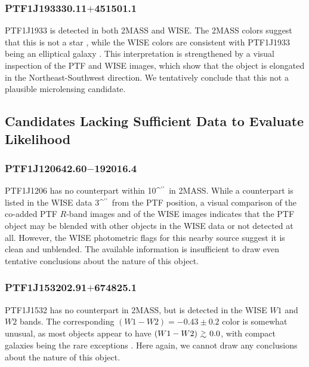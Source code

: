 \documentclass{emulateapj}
\newcommand{\gapprox }{{\lower0.8ex\hbox{$\buildrel >\over\sim$}}}
\def\asec{\ifmmode^{\prime\prime}\else$^{\prime\prime}$\fi}
\begin{document}

\subsubsection*{PTF1J193330.11$+$451501.1} %
PTF1J1933 is detected in both 2MASS and WISE. The 2MASS colors suggest that this is not a star \citep{kev07}, while the WISE colors are consistent with PTF1J1933 being an elliptical galaxy \citep[cf.\ Figure 14 in][]{yan2013}. This interpretation is strengthened by a visual inspection of the PTF and WISE images, which show that the object is elongated in the Northeast-Southwest direction. We tentatively conclude that this not a plausible microlensing candidate. 

\subsection{Candidates Lacking Sufficient Data to Evaluate Likelihood}
\subsubsection*{PTF1J120642.60$-$192016.4} %
PTF1J1206 has no counterpart within 10\asec\ in 2MASS. While a counterpart is listed in the WISE data 3\asec\ from the PTF position, a visual comparison of the co-added PTF $R$-band images and of the WISE images indicates that the PTF object may be blended with other objects in the WISE data or not detected at all. However, the WISE photometric flags for this nearby source suggest it is clean and unblended. The available information is insufficient to draw even tentative conclusions about the nature of this object.

\subsubsection*{PTF1J153202.91$+$674825.1} %
PTF1J1532 has no counterpart in 2MASS, but is detected in the WISE $W1$ and $W2$ bands. The corresponding $(W1-W2) = -0.43\pm0.2$ color is somewhat unusual, as most objects appear to have $(W1-W2)\ \gapprox\ 0.0$, with compact galaxies being the rare exceptions \citep[cf.\ Figure 14 in][]{yan2013}. Here again, we cannot draw any conclusions about the nature of this object. 
\end{document}

